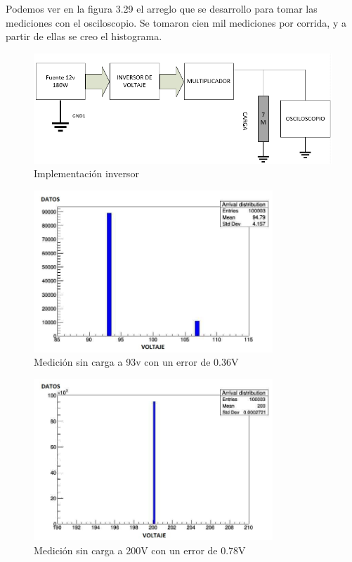 Podemos ver en la figura 3.29 el arreglo que se desarrollo para tomar las mediciones con el osciloscopio. Se tomaron cien mil mediciones por corrida, y a partir de ellas se creo el histograma.


\begin{figure}[H]
\centering
\includegraphics[width=12cm]{Capitulo3/figs/experi.png}
\caption{Implementación inversor}
\end{figure}



\begin{figure}[H]
\centering
\includegraphics[width=9cm]{Capitulo3/figs/93V.jpg}
\caption{Medición sin carga a 93v con un error de 0.36V}
\end{figure}

\begin{figure}[H]
\centering
\includegraphics[width=9cm]{Capitulo3/figs/200V.jpg}
\caption{Medición sin carga a 200V con un error de 0.78V}
\end{figure}

